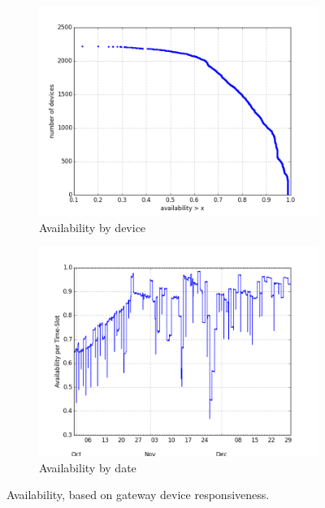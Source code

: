 \begin{figure}[t!]
\begin{minipage}{1\linewidth}
\centering
%
\begin{subfigure}[b]{0.5\linewidth}
\includegraphics[width=\linewidth]{figures/250-test_dw-availability-CDF.png}
  \caption{Availability by device}
  \label{fig:availability-device}
\end{subfigure}
%
\hspace{-1em}
%
\begin{subfigure}[b]{0.5\linewidth}
\includegraphics[width=\linewidth]{figures/250-test_dw-availability-by-date.png}
  \caption{Availability by date}
  \label{fig:availability-date}
\end{subfigure}
%
\end{minipage}
\caption{Availability, based on gateway device responsiveness. }
\label{fig:availability}
\end{figure}


